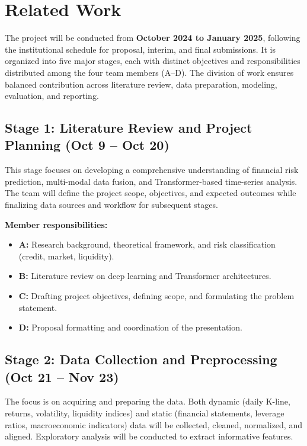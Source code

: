 \section{Related Work}
\label{sec:Timetable and workload division}
The project will be conducted from \textbf{October 2024 to January 2025}, following the institutional schedule for proposal, interim, and final submissions.
It is organized into five major stages, each with distinct objectives and responsibilities distributed among the four team members (A--D).
The division of work ensures balanced contribution across literature review, data preparation, modeling, evaluation, and reporting.

\subsection{Stage 1: Literature Review and Project Planning (Oct 9 -- Oct 20)}
This stage focuses on developing a comprehensive understanding of financial risk prediction, multi-modal data fusion, and Transformer-based time-series analysis.
The team will define the project scope, objectives, and expected outcomes while finalizing data sources and workflow for subsequent stages.

\textbf{Member responsibilities:}
\begin{itemize}
    \item \textbf{A:} Research background, theoretical framework, and risk classification (credit, market, liquidity).
    \item \textbf{B:} Literature review on deep learning and Transformer architectures.
    \item \textbf{C:} Drafting project objectives, defining scope, and formulating the problem statement.
    \item \textbf{D:} Proposal formatting and coordination of the presentation.
\end{itemize}

\subsection{Stage 2: Data Collection and Preprocessing (Oct 21 -- Nov 23)}
The focus is on acquiring and preparing the data. Both dynamic (daily K-line, returns, volatility, liquidity indices) and static (financial statements, leverage ratios, macroeconomic indicators) data will be collected, cleaned, normalized, and aligned. Exploratory analysis will be conducted to extract informative features.

